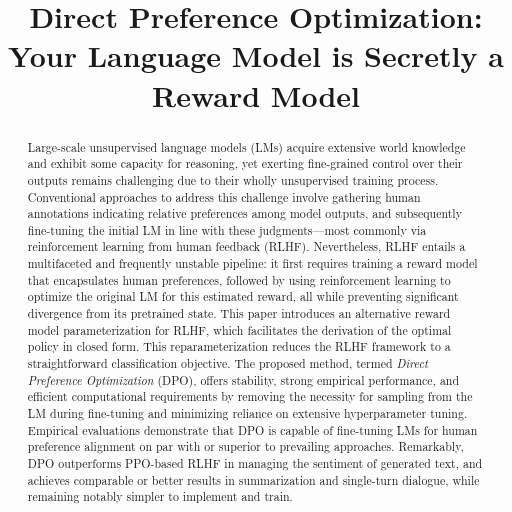 \title{Direct Preference Optimization: Your Language Model is Secretly a Reward Model}

\begin{abstract}
Large-scale unsupervised language models (LMs) acquire extensive world knowledge and exhibit some capacity for reasoning, yet exerting fine-grained control over their outputs remains challenging due to their wholly unsupervised training process. Conventional approaches to address this challenge involve gathering human annotations indicating relative preferences among model outputs, and subsequently fine-tuning the initial LM in line with these judgments—most commonly via reinforcement learning from human feedback (RLHF). Nevertheless, RLHF entails a multifaceted and frequently unstable pipeline: it first requires training a reward model that encapsulates human preferences, followed by using reinforcement learning to optimize the original LM for this estimated reward, all while preventing significant divergence from its pretrained state. This paper introduces an alternative reward model parameterization for RLHF, which facilitates the derivation of the optimal policy in closed form. This reparameterization reduces the RLHF framework to a straightforward classification objective. The proposed method, termed \textit{Direct Preference Optimization} (DPO), offers stability, strong empirical performance, and efficient computational requirements by removing the necessity for sampling from the LM during fine-tuning and minimizing reliance on extensive hyperparameter tuning. Empirical evaluations demonstrate that DPO is capable of fine-tuning LMs for human preference alignment on par with or superior to prevailing approaches. Remarkably, DPO outperforms PPO-based RLHF in managing the sentiment of generated text, and achieves comparable or better results in summarization and single-turn dialogue, while remaining notably simpler to implement and train.
\end{abstract}

